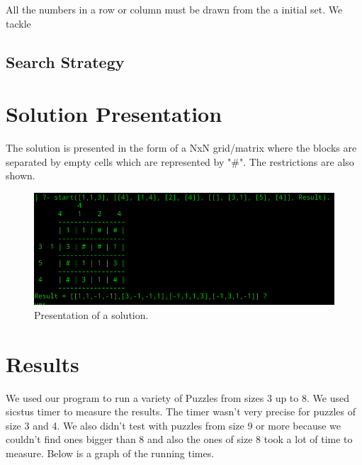 \documentclass{llncs}
\begin{document}
All the numbers in a row or column must be drawn from the a initial set. We tackle

\subsection{Search Strategy}

\section{Solution Presentation}

The solution is presented in the form of a NxN grid/matrix where the blocks are separated by empty cells which are represented by "\#". The restrictions are also shown.

\vspace{1.5cm}
\begin{figure}
  \centering
  \includegraphics[width=\textwidth]{solution-example.png}
\caption{Presentation of a solution.}
  \label{fig:ex_sol_jp_sums}
\end{figure}



\section{Results}
We used our program to run a variety of Puzzles from sizes 3 up to 8. We used sicstus timer to measure the results. The timer wasn't very precise for puzzles of size 3 and 4. We also didn't test with puzzles from size 9 or more because we couldn't find ones bigger than 8 and also the ones of size 8 took a lot of time to measure. Below is a graph of the running times.
\end{document}
